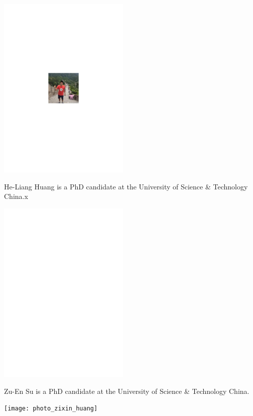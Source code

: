%
%

\begin{center}
\includegraphics[width=0.47\textwidth]{photo_heliang_huang}
\end{center}

He-Liang Huang is a PhD candidate at the University of Science \& Technology China.x

%
%

\begin{center}
\includegraphics[width=0.47\textwidth]{photo_zuen_su}
\end{center}

Zu-En Su is a PhD candidate at the University of Science \& Technology China.


%
%

\begin{center}
\texttt{[image: photo\_zixin\_huang]}
\end{center}

